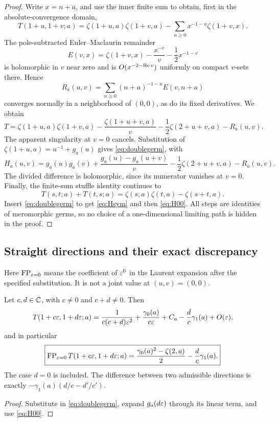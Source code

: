 \begin{proof}
Write $x=n+a$, and use the inner finite sum to obtain, first in the
absolute-convergence domain,
\[
 T(1+u,1+v;a)=\zeta(1+u,a)\zeta(1+v,a)
       -\sum_{n\ge0}x^{-1-u}\zeta(1+v,x).
\]
The pole-subtracted Euler--Maclaurin remainder
\[
 E(v,x)=\zeta(1+v,x)-\frac{x^{-v}}v-\frac12x^{-1-v}
\]
is holomorphic in $v$ near zero and is
$O(x^{-2-\operatorname{Re} v})$ uniformly on compact $v$-sets there. Hence
\[
 R_a(u,v)=\sum_{n\ge0}(n+a)^{-1-u}E(v,n+a)
\]
converges normally in a neighborhood of $(0,0)$, as do its fixed
derivatives. We obtain
\begin{equation}\label{eq:doubleEM}
 T=\zeta(1+u,a)\zeta(1+v,a)
   -\frac{\zeta(1+u+v,a)}v
   -\frac12\zeta(2+u+v,a)-R_a(u,v).
\end{equation}
The apparent singularity at $v=0$ cancels. Substitution of
$\zeta(1+u,a)=u^{-1}+g_a(u)$ gives \eqref{eq:doublegerm}, with
\begin{equation}\label{eq:Hrepresentation}
 H_a(u,v)=g_a(u)g_a(v)
  +\frac{g_a(u)-g_a(u+v)}v
  -\frac12\zeta(2+u+v,a)-R_a(u,v).
\end{equation}
The divided difference is holomorphic, since its numerator vanishes at
$v=0$. Finally, the finite-sum stuffle identity continues to
\[
 T(s,t;a)+T(t,s;a)=\zeta(s,a)\zeta(t,a)-\zeta(s+t,a).
\]
Insert \eqref{eq:doublegerm} to get \eqref{eq:Hsym} and then
\eqref{eq:H00}. All steps are identities of meromorphic germs, so no
choice of a one-dimensional limiting path is hidden in the proof.
\end{proof}

\subsection{Straight directions and their exact discrepancy}

Here $\operatorname{FP}_{\varepsilon=0}$ means the coefficient of $\varepsilon^0$ in the Laurent
expansion after the specified substitution. It is not a joint value at
$(u,v)=(0,0)$.

\begin{corollary}\label{cor:direction}
Let $c,d\in\mathbb C$, with $c\ne0$ and $c+d\ne0$. Then
\begin{align}\label{eq:direction-expansion}
 T(1+c\varepsilon,1+d\varepsilon;a)
  =\frac1{c(c+d)\varepsilon^2}
     +\frac{\gamma_0(a)}{c\varepsilon}
     +C_a-\frac dc\gamma_1(a)+O(\varepsilon),
\end{align}
and in particular
\begin{equation}\label{eq:direction-FP}
 \boxed{\operatorname{FP}_{\varepsilon=0}T(1+c\varepsilon,1+d\varepsilon;a)
   =\frac{\gamma_0(a)^2-\zeta(2,a)}2-\frac dc\gamma_1(a).}
\end{equation}
The case $d=0$ is included. The difference between two admissible
directions is exactly
$-\gamma_1(a)(d/c-d'/c')$.
\end{corollary}
\begin{proof}
Substitute in \eqref{eq:doublegerm}, expand $g_a(d\varepsilon)$ through its
linear term, and use \eqref{eq:H00}.
\end{proof}

